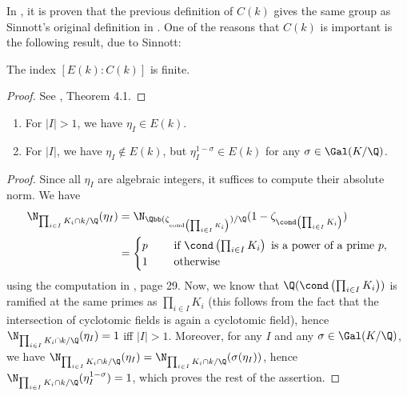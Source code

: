In \citep{Lettl1990}, it is proven that the previous definition of $C(k)$ gives the same group as Sinnott's original definition in \citep{SinnottAb}. One of the reasons that $C(k)$ is important is the following result, due to Sinnott:
\begin{theorem}\label{finind}
The index $[E(k):C(k)]$ is finite.
\end{theorem}
\begin{proof}
See \citep{SinnottAb}, Theorem 4.1.
\end{proof}

\begin{lemma}\leavevmode \label{units}
\begin{enumerate}%
\item For $|I|>1$, we have $\eta_I\in E(k)$.
\item For $|I|$, we have $\eta_I\not\in E(k)$, but $\eta_I^{1-\sigma}\in E(k)$ for any $\sigma\in \Gal(K/\Q)$. %
\end{enumerate}
\end{lemma}
\begin{proof}
Since all $\eta_I$ are algebraic integers, it suffices to compute their absolute norm. We have 
\begin{align*}
\N_{\prod_{i\in I}K_i\cap k/\Q}(\eta_I)&=\N_{\Qbb(\zeta_{\text{cond} \left(\prod_{i\in I}K_i\right)})/\Q}
(1-\zeta_{\cond\left(\prod_{i\in I}K_i\right)})\\
&=\begin{cases}
p & \quad \text{ if } \cond\left(\prod_{i\in I}K_i\right) \text{ is a power of a prime } p,\\
1 & \quad \text{ otherwise } \\
\end{cases}
\end{align*}
using the computation in \citep{Sedlacek2015thesis}, page 29. Now, we know that $\Q(\cond\left(\prod_{i\in I}K_i\right))$ is ramified at the same primes as $\prod_{i\in I}K_i$ (this follows from the fact that the intersection of cyclotomic fields is again a cyclotomic field), hence $\N_{\prod_{i\in I}K_i\cap k/\Q}(\eta_I)=1$ iff $|I|>1$. Moreover, for any $I$ and any $\sigma\in \Gal(K/\Q)$, we have $\N_{\prod_{i\in I}K_i\cap k/\Q}(\eta_I)=\N_{\prod_{i\in I}K_i\cap k/\Q}(\sigma(\eta_I))$, hence $\N_{\prod_{i\in I}K_i\cap k/\Q}(\eta_I^{1-\sigma})=1$, which proves the rest of the assertion.
\end{proof}


